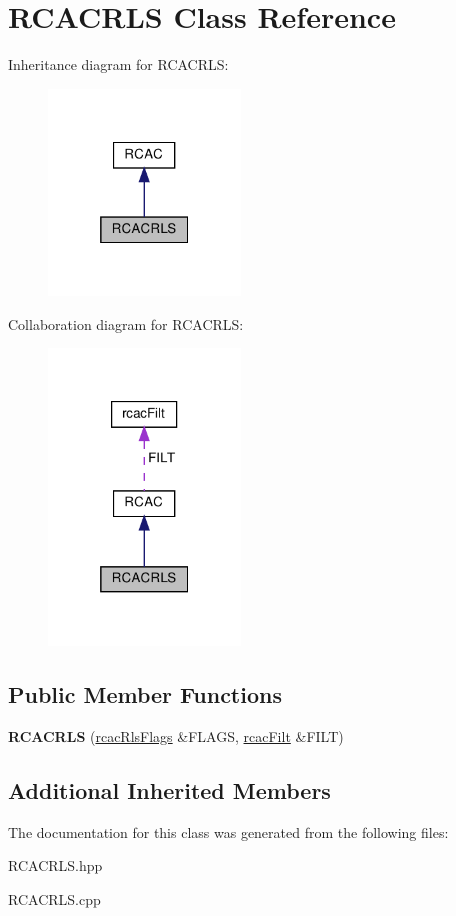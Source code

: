 \hypertarget{class_r_c_a_c_r_l_s}{}\section{R\+C\+A\+C\+R\+LS Class Reference}
\label{class_r_c_a_c_r_l_s}


Inheritance diagram for R\+C\+A\+C\+R\+LS\+:\nopagebreak
\begin{figure}[H]
\begin{center}
\leavevmode
\includegraphics[width=145pt]{class_r_c_a_c_r_l_s__inherit__graph}
\end{center}
\end{figure}


Collaboration diagram for R\+C\+A\+C\+R\+LS\+:\nopagebreak
\begin{figure}[H]
\begin{center}
\leavevmode
\includegraphics[width=145pt]{class_r_c_a_c_r_l_s__coll__graph}
\end{center}
\end{figure}
\subsection*{Public Member Functions}
\begin{DoxyCompactItemize}
\item 
\mbox{\label{class_r_c_a_c_r_l_s_aaac6f50062f37e04d10c40ba55063324}} 
{\bfseries R\+C\+A\+C\+R\+LS} (\hyperlink{structrcac_rls_flags}{rcac\+Rls\+Flags} \&F\+L\+A\+GS, \hyperlink{structrcac_filt}{rcac\+Filt} \&F\+I\+LT)
\end{DoxyCompactItemize}
\subsection*{Additional Inherited Members}


The documentation for this class was generated from the following files\+:\begin{DoxyCompactItemize}
\item 
R\+C\+A\+C\+R\+L\+S.\+hpp\item 
R\+C\+A\+C\+R\+L\+S.\+cpp\end{DoxyCompactItemize}
